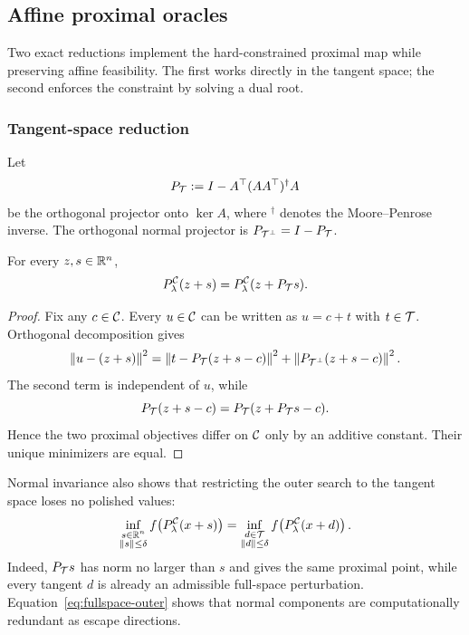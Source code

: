 \subsection{Affine proximal oracles}
\label{sec:affine-prox}

Two exact reductions implement the hard-constrained proximal map while
preserving affine feasibility.  The first works directly in the tangent
space; the second enforces the constraint by solving a dual root.

\subsubsection{Tangent-space reduction}

Let
\begin{equation}
  P_{\mathcal{T}}
  :=I-A^\top(AA^\top)^\dagger A
  \label{eq:tangent-projector}
\end{equation}
be the orthogonal projector onto \(\ker A\), where \({}^\dagger\) denotes the
Moore--Penrose inverse.  The orthogonal normal projector is
\(P_{\mathcal{T}^\perp}=I-P_{\mathcal{T}}\).

\begin{lemma}
  \label{lem:normal-invariance}
  For every \(z,s\in\mathbb{R}^n\),
  \begin{equation}
    P_\lambda^{\mathcal{C}}(z+s)
    =
    P_\lambda^{\mathcal{C}}(z+P_{\mathcal{T}}s).
    \label{eq:normal-invariance}
  \end{equation}
\end{lemma}

\begin{proof}
  Fix any \(c\in\mathcal{C}\).  Every \(u\in\mathcal{C}\) can be written as
  \(u=c+t\) with \(t\in\mathcal{T}\).  Orthogonal decomposition gives
  \[
    \left\lVert u-(z+s)\right\rVert^2
    =
    \left\lVert t-P_{\mathcal{T}}(z+s-c)\right\rVert^2
    +
    \left\lVert P_{\mathcal{T}^\perp}(z+s-c)\right\rVert^2.
  \]
  The second term is independent of \(u\), while
  \[
    P_{\mathcal{T}}(z+s-c)
    =
    P_{\mathcal{T}}(z+P_{\mathcal{T}}s-c).
  \]
  Hence the two proximal objectives differ on \(\mathcal{C}\) only by an additive
  constant.  Their unique minimizers are equal.
\end{proof}

Normal invariance also shows that restricting the outer search to the tangent
space loses no polished values:
\begin{equation}
  \inf_{\substack{s\in\mathbb{R}^n\\\left\lVert s\right\rVert\le\delta}}
  f\!\left(P_\lambda^{\mathcal{C}}(x+s)\right)
  =
  \inf_{\substack{d\in\mathcal{T}\\\left\lVert d\right\rVert\le\delta}}
  f\!\left(P_\lambda^{\mathcal{C}}(x+d)\right).
  \label{eq:fullspace-outer}
\end{equation}
Indeed, \(P_{\mathcal{T}}s\) has norm no larger than \(s\) and gives the same
proximal point, while every tangent \(d\) is already an admissible
  full-space perturbation.  Equation~\eqref{eq:fullspace-outer} shows that
  normal components are computationally redundant as escape directions.

